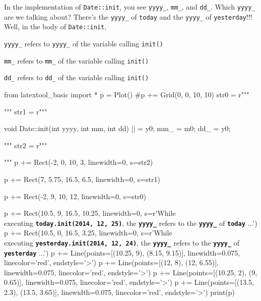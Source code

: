 In the implementation of \texttt{Date::init}, you see \texttt{yyyy\_},
\texttt{mm\_}, and \texttt{dd\_}. Which \texttt{yyyy\_} are we talking about?
There's the \texttt{yyyy\_} of \texttt{today} and the
\texttt{yyyy\_} of \texttt{yesterday}!!! Well, in the body of
\texttt{Date::init},
\begin{center}
\texttt{yyyy\_} refers to \texttt{yyyy\_} of the variable calling \texttt{init()}

\texttt{mm\_} refers to \texttt{mm\_} of the variable calling \texttt{init()}

\texttt{dd\_} refers to \texttt{dd\_} of the variable calling \texttt{init()}
\end{center}
\begin{python}
from latextool_basic import *
p = Plot()
#p += Grid(0, 0, 10, 10)
str0 = r"""
\begin{consolethree}[escapeinside=||]
...

int main()
{
    ...

    ||

    ...
\end{consolethree}
"""
str1 = r"""
\begin{consolethree}[escapeinside=||]
void Date::init(int yyyy, int mm, int dd)
{
    || = y0;
    mm_ = m0;
    dd_ = y0;
}
\end{consolethree}
"""
str2 = r"""
\begin{consolethree}[escapeinside=||]
...

int main()
{
    ...

    ||

    ...
\end{consolethree}
"""
p += Rect(-2, 0, 10, 3, linewidth=0, s=str2)

p += Rect(7, 5.75, 16.5, 6.5, linewidth=0, s=str1)

p += Rect(-2, 9, 10, 12, linewidth=0, s=str0)

p += Rect(10.5, 9, 16.5, 10.25, linewidth=0, s=r'While \\executing \textbf{\texttt{today.init(2014, 12, 25)}}, the \textbf{\texttt{yyyy\_}} refers to the \textbf{\texttt{yyyy\_}} of \textbf{\texttt{today}} ...')
p += Rect(10.5, 0, 16.5, 3.25, linewidth=0, s=r'While \\executing \textbf{\texttt{yesterday.init(2014, 12, 24)}}, the \textbf{\texttt{yyyy\_}} refers to the \textbf{\texttt{yyyy\_}} of \textbf{\texttt{yesterday}} ...')
p += Line(points=[(10.25, 9), (8.15, 9.15)], linewidth=0.075, linecolor='red', endstyle='>')
p += Line(points=[(12, 8), (12, 6.55)], linewidth=0.075, linecolor='red', endstyle='>')
p += Line(points=[(10.25, 2), (9, 0.65)], linewidth=0.075, linecolor='red', endstyle='>')
p += Line(points=[(13.5, 2.3), (13.5, 3.65)], linewidth=0.075, linecolor='red', endstyle='>')
print(p)
\end{python}


